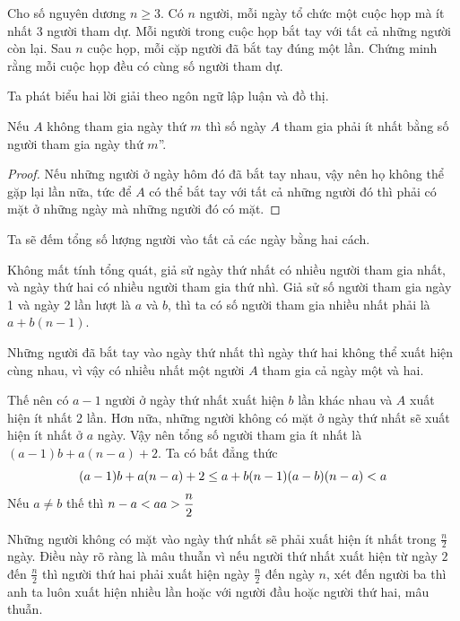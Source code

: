 \documentclass[11pt]{scrartcl}
\begin{document}
\begin{itemize}[label=, leftmargin=0em, itemsep=0.5em]
\begin{btvn}
\begin{enumerate}[label=(\alph*)]
        \end{enumerate}
    \end{btvn}
    \begin{bt}
        Cho số nguyên dương $n \geq 3$. Có $n$ người, mỗi ngày tổ chức một cuộc họp mà ít nhất 3 người tham dự. Mỗi người trong cuộc họp bắt tay với tất cả những người còn lại. Sau $n$ cuộc họp, mỗi cặp người đã bắt tay đúng một lần. Chứng minh rằng mỗi cuộc họp đều có cùng số người tham dự.
    \end{bt}
    Ta phát biểu hai lời giải theo ngôn ngữ lập luận và đồ thị. 
    \begin{sol}

         Nếu $A$ không tham gia ngày thứ $m$ thì số ngày $A$ tham gia phải ít nhất bằng số người tham gia ngày thứ $m$''. 
        \begin{proof}
            Nếu những người ở ngày hôm đó đã bắt tay nhau, vậy nên họ không thể gặp lại lần nữa, tức để $A$ có thể bắt tay với tất cả những người đó thì phải có mặt ở những ngày mà những người đó có mặt.
        \end{proof}
        
        Ta sẽ đếm tổng số lượng người vào tất cả các ngày bằng hai cách.

        Không mất tính tổng quát, giả sử ngày thứ nhất có nhiều người tham gia nhất, và ngày thứ hai có nhiều người tham gia thứ nhì. Giả sử số người tham gia ngày 1 và ngày 2 lần lượt là $a$ và $b$, thì ta có số người tham gia nhiều nhất phải là $a + b(n - 1)$.


        Những người đã bắt tay vào ngày thứ nhất thì ngày thứ hai không thể xuất hiện cùng nhau, vì vậy có nhiều nhất một người $A$ tham gia cả ngày một và hai.


        Thế nên có $a - 1$ người ở ngày thứ nhất xuất hiện $b$ lần khác nhau và $A$ xuất hiện ít nhất 2 lần. Hơn nữa, những người không có mặt ở ngày thứ nhất sẽ xuất hiện ít nhất ở $a$ ngày. Vậy nên tổng số người tham gia ít nhất là $(a - 1)b + a(n-a) + 2$. Ta có bất đẳng thức 
        \[
            (a - 1)b + a(n - a) + 2 \leq a + b( n - 1) \lra (a - b)( n - a ) < a
        \]
        Nếu $a \neq b$ thế thì $n - a < a \lra a > \frac{n}{2}$
        
        
        Những người không có mặt vào ngày thứ nhất sẽ phải xuất hiện ít nhất trong $\frac{n}{2}$ ngày. Điều này rõ ràng là mâu thuẫn vì nếu người thứ nhất xuất hiện từ ngày $2$ đến $\frac{n}{2}$ thì người thứ hai phải xuất hiện ngày $\frac{n}{2}$ đến ngày $n$, xét đến người ba thì anh ta luôn xuất hiện nhiều lần hoặc với người đầu hoặc người thứ hai, mâu thuẫn.



\end{sol}
\end{itemize}
\end{document}
